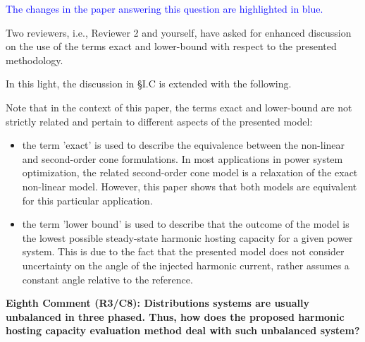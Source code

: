 \documentclass[10pt]{article}
\begin{document}
\begin{tcolorbox}[colback=black!5!white,colframe=black]

\textcolor{blue}{The changes in the paper answering this question are highlighted in blue.} \newline 

Two reviewers, i.e., Reviewer 2 and yourself, have asked for enhanced discussion on the use of the terms exact and lower-bound with respect to the presented methodology. \newline

In this light, the discussion in \S I.C is extended with the following. \newline

Note that in the context of this paper, the terms exact and lower-bound are not strictly related and pertain to different aspects of the presented model:
\begin{itemize}
    \item the term 'exact' is used to describe the equivalence between the non-linear and second-order cone formulations. In most applications in power system optimization, the related second-order cone model is a relaxation of the exact non-linear model. However, this paper shows that both models are equivalent for this particular application.
    \item the term 'lower bound' is used to describe that the outcome of the model is the lowest possible steady-state harmonic hosting capacity for a given power system. This is due to the fact that the presented model does not consider uncertainty on the angle of the injected harmonic current, rather assumes a constant angle relative to the reference.
\end{itemize}

\end{tcolorbox}

\textbf{Eighth Comment (R3/C8): Distributions systems are usually unbalanced in three phased. Thus, how does the proposed harmonic hosting capacity evaluation method deal with such unbalanced system? }
\end{document}
